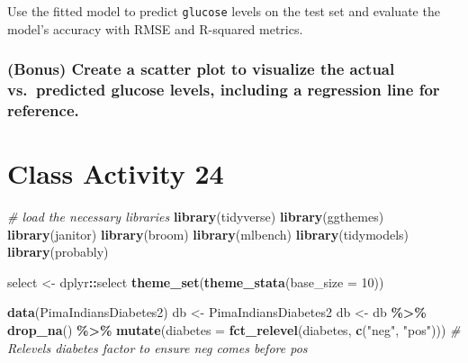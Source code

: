 \documentclass[
]{book}
\newenvironment{Shaded}{\begin{snugshade}}{\end{snugshade}}
\newcommand{\AttributeTok}[1]{\textcolor[rgb]{0.13,0.29,0.53}{#1}}
\newcommand{\CommentTok}[1]{\textcolor[rgb]{0.56,0.35,0.01}{\textit{#1}}}
\newcommand{\DecValTok}[1]{\textcolor[rgb]{0.00,0.00,0.81}{#1}}
\newcommand{\FunctionTok}[1]{\textcolor[rgb]{0.13,0.29,0.53}{\textbf{#1}}}
\newcommand{\NormalTok}[1]{#1}
\newcommand{\OtherTok}[1]{\textcolor[rgb]{0.56,0.35,0.01}{#1}}
\newcommand{\SpecialCharTok}[1]{\textcolor[rgb]{0.81,0.36,0.00}{\textbf{#1}}}
\newcommand{\StringTok}[1]{\textcolor[rgb]{0.31,0.60,0.02}{#1}}
\begin{document}
Use the fitted model to predict \texttt{glucose} levels on the test set and evaluate the model's accuracy with RMSE and R-squared metrics.

\hypertarget{bonus-create-a-scatter-plot-to-visualize-the-actual-vs.-predicted-glucose-levels-including-a-regression-line-for-reference.}{%
\subsection{(Bonus) Create a scatter plot to visualize the actual vs.~predicted glucose levels, including a regression line for reference.}\label{bonus-create-a-scatter-plot-to-visualize-the-actual-vs.-predicted-glucose-levels-including-a-regression-line-for-reference.}}

\hypertarget{class-activity-24}{%
\chapter{Class Activity 24}\label{class-activity-24}}

\begin{Shaded}
\begin{Highlighting}[]
\CommentTok{\# load the necessary libraries}
\FunctionTok{library}\NormalTok{(tidyverse) }
\FunctionTok{library}\NormalTok{(ggthemes)}
\FunctionTok{library}\NormalTok{(janitor)}
\FunctionTok{library}\NormalTok{(broom)}
\FunctionTok{library}\NormalTok{(mlbench)}
\FunctionTok{library}\NormalTok{(tidymodels)}
\FunctionTok{library}\NormalTok{(probably)}

\NormalTok{select }\OtherTok{\textless{}{-}}\NormalTok{ dplyr}\SpecialCharTok{::}\NormalTok{select}
\FunctionTok{theme\_set}\NormalTok{(}\FunctionTok{theme\_stata}\NormalTok{(}\AttributeTok{base\_size =} \DecValTok{10}\NormalTok{))}

\FunctionTok{data}\NormalTok{(PimaIndiansDiabetes2)}
\NormalTok{db }\OtherTok{\textless{}{-}}\NormalTok{ PimaIndiansDiabetes2}
\NormalTok{db }\OtherTok{\textless{}{-}}\NormalTok{ db }\SpecialCharTok{\%\textgreater{}\%} \FunctionTok{drop\_na}\NormalTok{()  }\SpecialCharTok{\%\textgreater{}\%} 
  \FunctionTok{mutate}\NormalTok{(}\AttributeTok{diabetes =} \FunctionTok{fct\_relevel}\NormalTok{(diabetes, }\FunctionTok{c}\NormalTok{(}\StringTok{"neg"}\NormalTok{, }\StringTok{"pos"}\NormalTok{))) }\CommentTok{\# Relevels \textquotesingle{}diabetes\textquotesingle{} factor to ensure \textquotesingle{}neg\textquotesingle{} comes before \textquotesingle{}pos\textquotesingle{}}
\end{Highlighting}
\end{Shaded}
\end{document}
